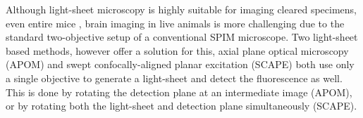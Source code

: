     Although light-sheet microscopy is highly suitable for imaging cleared specimens, even entire mice \cite{tainaka_whole-body_2014}, brain imaging in live animals is more challenging due to the standard two-objective setup of a conventional SPIM microscope. Two light-sheet based methods, however offer a solution for this, axial plane optical microscopy (APOM) \cite{li_axial_2014} and swept confocally-aligned planar excitation (SCAPE) \cite{bouchard_swept_2015} both use only a single objective to generate a light-sheet and detect the fluorescence as well. This is done by rotating the detection plane at an intermediate image (APOM), or by rotating both the light-sheet and detection plane simultaneously (SCAPE).



